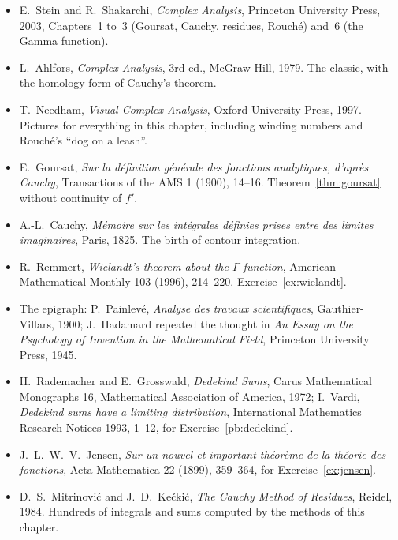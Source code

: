 \begin{itemize}
\item E.~Stein and R.~Shakarchi, \emph{Complex Analysis}, Princeton University Press, 2003, Chapters~1 to~3 (Goursat,
Cauchy, residues, Rouch\'e) and~6 (the Gamma function).
\item L.~Ahlfors, \emph{Complex Analysis}, 3rd ed., McGraw-Hill, 1979. The classic, with the homology form of Cauchy's theorem.
\item T.~Needham, \emph{Visual Complex Analysis}, Oxford University Press, 1997. Pictures for everything in this chapter,
including winding numbers and Rouch\'e's ``dog on a leash''.
\item E.~Goursat, \emph{Sur la d\'efinition g\'en\'erale des fonctions analytiques, d'apr\`es Cauchy}, Transactions of the AMS 1
(1900), 14--16. Theorem~\ref{thm:goursat} without continuity of $f'$.
\item A.-L.~Cauchy, \emph{M\'emoire sur les int\'egrales d\'efinies prises entre des limites imaginaires}, Paris, 1825. The birth
of contour integration.
\item R.~Remmert, \emph{Wielandt's theorem about the $\Gamma$-function}, American Mathematical Monthly 103 (1996), 214--220.
Exercise~\ref{ex:wielandt}.
\item The epigraph: P.~Painlev\'e, \emph{Analyse des travaux scientifiques}, Gauthier-Villars, 1900; J.~Hadamard repeated the
thought in \emph{An Essay on the Psychology of Invention in the Mathematical Field}, Princeton University Press, 1945.
\item H.~Rademacher and E.~Grosswald, \emph{Dedekind Sums}, Carus Mathematical Monographs 16, Mathematical Association of
America, 1972; I.~Vardi, \emph{Dedekind sums have a limiting distribution}, International Mathematics Research Notices 1993,
1--12, for Exercise~\ref{pb:dedekind}.
\item J.~L.~W.~V.~Jensen, \emph{Sur un nouvel et important th\'eor\`eme de la th\'eorie des fonctions}, Acta Mathematica 22 (1899),
359--364, for Exercise~\ref{ex:jensen}.
\item D.~S.~Mitrinovi\'c and J.~D.~Ke\v cki\'c, \emph{The Cauchy Method of Residues}, Reidel, 1984. Hundreds of integrals and
sums computed by the methods of this chapter.
\end{itemize}
